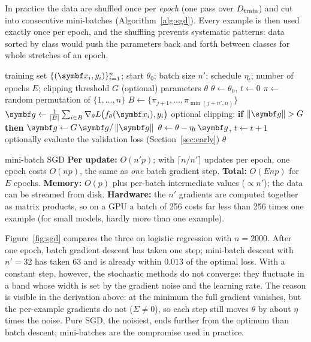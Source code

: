 \documentclass[11pt]{article}
\newcommand{\gvec}{\vect{g}}
\begin{document}
In practice the data are shuffled once per \emph{epoch} (one pass over $D_{\mathrm{train}}$) and cut into consecutive
mini-batches (Algorithm~\ref{alg:sgd}). Every example is then used exactly once per epoch, and the shuffling prevents systematic
patterns: data sorted by class would push the parameters back and forth between classes for whole stretches of an epoch.

\begin{algorithm}[tb]
\caption{Mini-batch stochastic gradient descent with shuffling}\label{alg:sgd}
\begin{algorithmic}[1]
\Require training set $\{(\x_i, y_i)\}_{i=1}^n$; start $\theta_0$; batch size $n'$; schedule $\eta_t$; number of epochs $E$; clipping threshold $G$ (optional)
\Ensure parameters $\theta$
  \State $\theta \gets \theta_0$, \quad $t \gets 0$
    \State $\pi \gets$ random permutation of $\{1, \dots, n\}$ 
      \State $B \gets \{\pi_{j+1}, \dots, \pi_{\min(j + n', n)}\}$
      \State $\gvec \gets \frac{1}{|B|}\sum_{i \in B} \nabla_\theta L\big(f_\theta(\x_i), y_i\big)$ 
      \State optional clipping: \textbf{if} $\norm{\gvec} > G$ \textbf{then} $\gvec \gets G\,\gvec/\norm{\gvec}$ 
      \State $\theta \gets \theta - \eta_t\,\gvec$, \quad $t \gets t + 1$
    \EndFor
    \State optionally evaluate the validation loss (Section~\ref{sec:early})
  \EndFor
  \State \Return $\theta$
\EndFunction
\end{algorithmic}
\end{algorithm}

\begin{runtime}{mini-batch SGD}
\textbf{Per update:} $O(n'p)$; with $\lceil n/n'\rceil$ updates per epoch, one epoch costs $O(np)$, the same as
\emph{one} batch gradient step. \textbf{Total:} $O(Enp)$ for $E$ epochs. \textbf{Memory:} $O(p)$ plus per-batch
intermediate values ($\propto n'$); the data can be streamed from disk. \textbf{Hardware:} the $n'$ gradients are
computed together as matrix products, so on a GPU a batch of 256 costs far less than 256 times one example (for small
models, hardly more than one example).
\end{runtime}

Figure~\ref{fig:sgd} compares the three on logistic regression with $n = 2000$. After one epoch, batch gradient descent
has taken one step; mini-batch descent with $n' = 32$ has taken 63 and is already within $0.013$ of the optimal loss.
With a constant step, however, the stochastic methods do not converge: they fluctuate in a band whose width is set by
the gradient noise and the learning rate. The reason is visible in the derivation above: at the minimum the full
gradient vanishes, but the per-example gradients do not ($\Sigma \ne 0$), so each step still moves $\theta$ by about
$\eta$ times the noise. Pure SGD, the noisiest, ends further from the optimum than batch descent; mini-batches are
the compromise used in practice.
\end{document}
